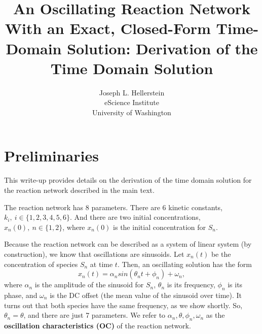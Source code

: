 \documentclass[11pt]{article}
\title{An Oscillating Reaction Network With an Exact, Closed-Form Time-Domain Solution: Derivation of the Time Domain Solution}
\author{Joseph L. Hellerstein\\ eScience Institute\\ University of Washington}
\begin{document}
    
    \maketitle
    
\section{Preliminaries}

    This write-up provides details on the derivation of the time domain solution for the reaction network described in the main text.

    The reaction network has 8 parameters. There are 6 kinetic constants,
\(k_i,~ i\in \{1, 2, 3, 4, 5, 6\}\). And there are two initial
concentrations, \(x_n (0),~ n \in \{1, 2 \}\), where \(x_n(0)\) is the
initial concentration for \(S_n\).

Because the reaction network can be described as a 
system of linear system (by construction), we
know that oscillations are sinusoids.
Let \(x_n (t)\) be the concentration
of species \(S_n\) at time \(t\). Then, an oscillating solution has the
form \begin{equation*}
x_n(t) = \alpha_n sin(\theta_n t + \phi_n) + \omega_n,
\end{equation*} where \(\alpha_n\) is the amplitude of the sinusoid for
\(S_n\), \(\theta_n\) is its frequency, \(\phi_n\) is its phase, and
\(\omega_n\) is the DC offset (the mean value of the sinusoid over
time).
It turns out that both species have the same frequency, as we show shortly.
So, $\theta_n = \theta$, and there are just 7 parameters.
We refer to \(\alpha_n, \theta, \phi_n, \omega_n\) as the
\textbf{oscillation characteristics (OC)} of the reaction network.
\end{document}
